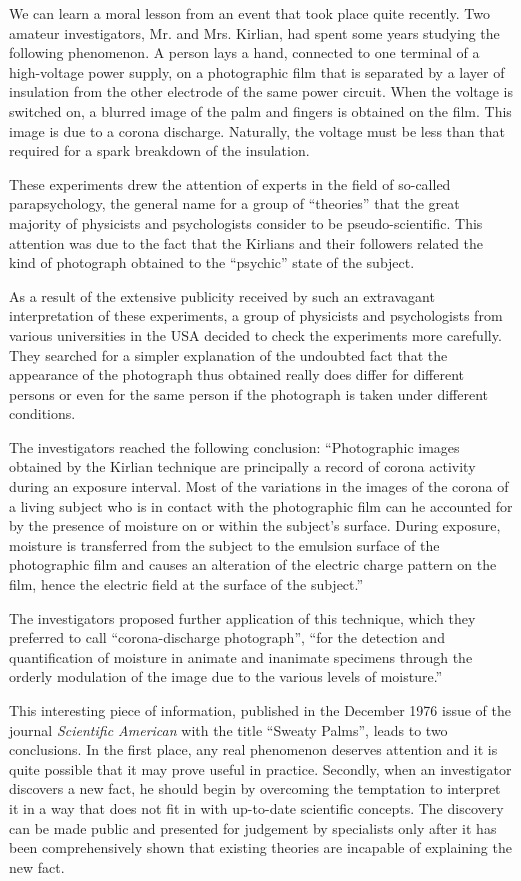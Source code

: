 We can learn a moral lesson from an event that took place quite recently. Two amateur investigators, Mr. and Mrs. Kirlian, had spent some years studying the following phenomenon. A person lays a hand, connected to one terminal of a high-voltage power supply, on a photographic film that is separated by a layer of insulation from the other electrode of the same power circuit. When the voltage is switched on, a blurred image of the palm and fingers is obtained on the film. This image is due to a corona discharge. Naturally, the voltage must be less than that required for a spark breakdown of the insulation.


These experiments drew the attention of experts in the field of so-called parapsychology, the general name for a group of ``theories'' that the great majority of physicists and psychologists consider to be pseudo-scientific.
This attention was due to the fact that the Kirlians and their followers related the kind of photograph obtained to the ``psychic'' state of the subject.

As a result of the extensive publicity received by such an extravagant interpretation of these experiments, a group of physicists and psychologists from various universities in the USA decided to check the experiments more carefully. They searched for a simpler explanation of the undoubted fact that the appearance of the photograph thus obtained really does differ for different persons or even for the same person if the photograph is taken under different conditions.

The investigators reached the following conclusion: ``Photographic images obtained by the Kirlian technique are principally a record of corona activity during an exposure interval. Most of the variations in the images of the corona of a living subject who is in contact with the photographic film can he accounted for by the presence of moisture on or within the subject's surface. During exposure, moisture is transferred from the subject to the emulsion surface of the photographic film and causes an alteration of the electric charge pattern on the film, hence the electric field at the surface of the subject.''

The investigators proposed further application of this technique, which they preferred to call ``corona-discharge photograph'', ``for the detection and quantification of moisture in animate and inanimate specimens through the orderly modulation of the image due to the various levels of moisture.''

This interesting piece of information, published in the December 1976 issue of the journal \emph{Scientific American} with the title ``Sweaty Palms'', leads to two conclusions. In the first place, any real phenomenon deserves attention and it is quite possible that it may prove useful in practice. Secondly, when an investigator discovers a new fact, he should begin by overcoming the temptation to interpret it in a way that does not fit in with up-to-date scientific concepts. The discovery can be made public and presented for judgement by specialists only after it has been comprehensively shown that existing theories are incapable of explaining the new fact.

